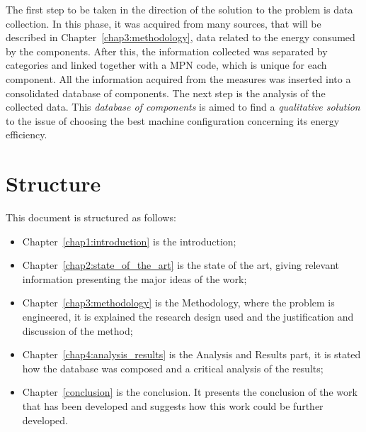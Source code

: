     The first step to be taken in the direction of the solution to the problem is data collection. In this phase, it was acquired from many sources, that will be described in Chapter~\ref{chap3:methodology}, data related to the energy consumed by the components. After this, the information collected was separated by categories and linked together with a MPN code, which is unique for each component. All the information acquired from the measures was inserted into a consolidated database of components. The next step is the analysis of the collected data. This \emph{database of components} is aimed to find a \emph{qualitative solution} to the issue of choosing the best machine configuration concerning its energy efficiency.

\section{Structure} \label{sec1:structure}

    This document is structured as follows:
    \begin{itemize}
        \item Chapter~\ref{chap1:introduction} is the introduction;
        \item Chapter~\ref{chap2:state_of_the_art} is the state of the art, giving relevant information presenting the major ideas of the work;
        \item Chapter~\ref{chap3:methodology} is the Methodology, where the problem is engineered, it is explained the research design used and the justification and discussion of the method;
        \item Chapter~\ref{chap4:analysis_results} is the Analysis and Results part, it is stated how the database was composed and a critical analysis of the results;
        \item Chapter~\ref{conclusion} is the conclusion. It presents the conclusion of the work that has been developed and suggests how this work could be further developed.
    \end{itemize}
    
    
